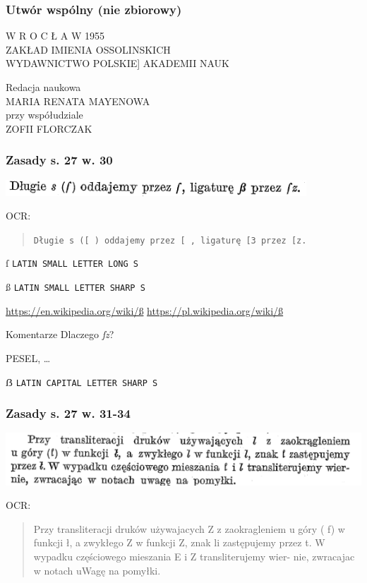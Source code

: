 \documentclass[pdfpagemode=UseNone]{beamer}
\newcommand\stpl[1]{{\JunicodePolish\colorbox{black!15}{#1}}}
\begin{document}
\begin{frame}
  \frametitle{Utwór wspólny (nie zbiorowy)}
W R O C Ł A W 1955\\
ZAKŁAD IMIENIA OSSOLINSKICH\\
WYDAWNICTWO POLSKIE] AKADEMII NAUK

\bigskip
Redacja naukowa\\
MARIA RENATA MAYENOWA\\
przy współudziale\\
ZOFII FLORCZAK\\

\end{frame}

\begin{frame}
  \frametitle{Zasady s. 27 w. 30}
  \includegraphics[width=\hsize]{img/Zasady27-30}

  OCR:\\
  \begin{quote}
  \texttt{Długie s ([ ) oddajemy przez [ , ligaturę [3 przez [z.}
\end{quote}

  {\stpl{ſ}}
    \texttt{LATIN SMALL LETTER LONG S}

    {\stpl{ß}}
    \texttt{LATIN SMALL LETTER SHARP S}

    \url{https://en.wikipedia.org/wiki/ß}
    \url{https://pl.wikipedia.org/wiki/ß}

    \begin{block}{Komentarze}
      Dlaczego \textit{ſz}?

      PESEL, \ldots

      \stpl{ẞ} \texttt{LATIN CAPITAL LETTER SHARP S}
    \end{block}
    
\end{frame}

\begin{frame}
  \frametitle{Zasady s. 27 w. 31-34}
  \includegraphics[width=\hsize]{img/Zasady27-31_34}

  OCR:
  \begin{quote}
Przy transliteracji druków używajacych Z z zaokragleniem
u góry ( f) w funkcji ł, a zwykłego Z w funkcji Z, znak li zastępujemy
przez t. W wypadku częściowego mieszania E i Z transliterujemy wier-
nie, zwracajac w notach uWagę na pomyłki.
\end{quote}
\end{frame}
\end{document}
